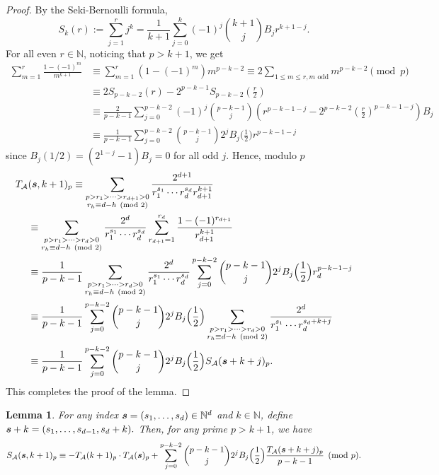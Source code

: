 \documentclass{article}
\newcommand{\bfs}{{\boldsymbol{\sl{s}}}}
\newcommand{\calA}{\mathcal{A}}
\newcommand{\N}{\mathbb{N}}
\theoremstyle{plain}
\newtheorem{lem}[thm]{Lemma}
\theoremstyle{definition}
\begin{document}
\begin{proof}
By the Seki-Bernoulli formula,
\begin{equation*}
S_k(r):=\sum_{j=1}^{r}j^k=\frac{1}{k+1}\sum_{j=0}^{k}(-1)^j\binom{k+1}{j}B_j r^{k+1-j}.
\end{equation*}
For all even $r\in\N$, noticing that $p>k+1$, we get
\begin{align*}
\sum_{m=1}^{r} \frac{1-(-1)^m}{m^{k+1}}&\equiv\sum_{m=1}^{r}(1-(-1)^m)m^{p-k-2}\equiv2\sum_{1\le m\le r, m \text{ odd}}  m^{p-k-2} \pmod{p}\\
&\equiv 2S_{p-k-2}(r)-2^{p-k-1}S_{p-k-2}\left( \frac{r}{2} \right)\\
&\equiv \frac{2}{p-k-1}\sum_{j=0}^{p-k-2}(-1)^j \binom{p-k-1}{j}\left(r^{p-k-1-j}-2^{p-k-2}\left(\frac{r}{2}\right)^{p-k-1-j}\right)B_{j}\\
&\equiv \frac{1}{p-k-1}\sum_{j=0}^{p-k-2} \binom{p-k-1}{j}2^jB_j\Big(\frac12\Big)r^{p-k-1-j}
\end{align*}
since $B_j(1/2)=(2^{1-j}-1)B_{j}=0$ for all odd $j$. Hence, modulo $p$
\begin{align*}
T_\calA& (\bfs,k+1)_p\equiv\sum_{\substack{p>r_1>\cdots >r_{d+1}>0 \\ r_h\equiv d-h\pmod 2}} \frac{2^{d+1}}{r_1^{s_1}\cdots r_d^{s_d} r_{d+1}^{k+1}} \notag \\
&\equiv\sum_{\substack{p>r_1>\cdots >r_d>0\\ r_h\equiv d-h\pmod 2}} \frac{2^d}{r_1^{s_1}\cdots r_d^{s_d}}\sum_{r_{d+1}=1}^{r_d}\frac{1-(-1)^{r_{d+1}}}{r_{d+1}^{k+1}}\notag\\
&\equiv\frac{1}{p-k-1}\sum_{\substack{p>r_1>\cdots >r_d>0\\r_h\equiv d-h\pmod 2}}\frac{2^d}{r_1^{s_1}\cdots r_d^{s_d}}\sum_{j=0}^{p-k-2} \binom{p-k-1}{j}2^jB_j\Big(\frac12\Big)r_d^{p-k-1-j}\notag\\
&\equiv \frac{1}{p-k-1}\sum_{j=0}^{p-k-2} \binom{p-k-1}{j}2^jB_j\Big(\frac12\Big)\sum_{\substack{p>r_1>\cdots >r_d>0\\r_h\equiv d-h\pmod 2}}\frac{2^d}{r_1^{s_1}\cdots r_d^{s_d+k+j}}\notag\\
&\equiv \frac{1}{p-k-1}\sum_{j=0}^{p-k-2} \binom{p-k-1}{j}2^jB_j\Big(\frac12\Big)S_\calA(\bfs+k+j)_p.
\end{align*}
This completes the proof of the lemma.
\end{proof}

\begin{lem}\label{lem:S2(x)}
For any index $\bfs=(s_1,\dots,s_d)\in\N^d$ and $k\in\N$, define $\bfs+k=(s_1,\dots,s_{d-1},s_d+k).$
Then, for any prime $p>k+1$, we have
\begin{equation*}
S_\calA(\bfs,k+1)_p\equiv -T_\calA(k+1)_p \cdot T_\calA(\bfs)_p
+\sum_{j=0}^{p-k-2}\binom{p-k-1}{j} 2^jB_j\Big(\frac12\Big)\frac{T_{\calA}(\bfs+k+j)_p }{p-k-1}\pmod{p}.
\end{equation*}
\end{lem}
\end{document}
